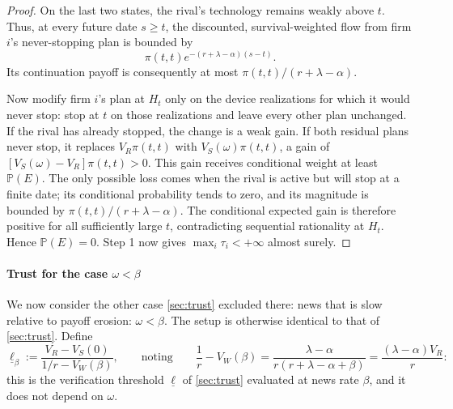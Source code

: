 \documentclass[12pt,reqno]{article}
\renewcommand{\Pr}{\mathbb{P}}
\theoremstyle{definition} \newtheorem{example}{Example}
\theoremstyle{definition} \newtheorem{condition}{Condition}
\theoremstyle{definition} \newtheorem{corollary}{Corollary}
\theoremstyle{definition} \newtheorem{claim}{Claim}
\theoremstyle{definition} \newtheorem{definition}{Definition}
\theoremstyle{definition} \newtheorem{conjecture}{Conjecture}
\theoremstyle{definition} \newtheorem{Lemma}{Lemma}
\theoremstyle{definition} \newtheorem{lemma}{Lemma}
\theoremstyle{plain} \newtheorem{theorem}{Theorem}
\theoremstyle{definition} \newtheorem{assumption}{Assumption}
\theoremstyle{definition} \newtheorem*{assumptionnonumber}{Assumption}
\theoremstyle{definition} \newtheorem*{theoremNoNumber}{Proposition}
\theoremstyle{definition}
\theoremstyle{definition}\newtheorem{proposition}{Proposition}
\theoremstyle{definition} \newtheorem{result}{Result}
\theoremstyle{definition} \newtheorem*{definitionNoNumber}{Definition}
\theoremstyle{definition} \newtheorem{Definition}{Definition}
\theoremstyle{definition} \newtheorem*{DefinitionNoNumber}{Definition}
\theoremstyle{definition} \newtheorem*{fact}{Fact}
\theoremstyle{definition} \newtheorem*{property}{Property}
\theoremstyle{definition} \newtheorem{remark}{Remark}
\begin{document}
\begin{proof}
On the last two states, the rival's technology remains weakly above $t$.
Thus, at every future date $s\ge t$, the discounted, survival-weighted flow
from firm $i$'s never-stopping plan is bounded by
\[
\pi(t,t)e^{-(r+\lambda-\alpha)(s-t)}.
\]
Its continuation payoff is consequently at most
$\pi(t,t)/(r+\lambda-\alpha)$.

Now modify firm $i$'s plan at $H_t$ only on the device realizations for which
it would never stop: stop at $t$ on those realizations and leave every other
plan unchanged. If the
rival has already stopped, the change is a weak gain. If both residual plans
never stop, it replaces $V_R\pi(t,t)$ with
$V_S(\omega)\pi(t,t)$, a gain of
$[V_S(\omega)-V_R]\pi(t,t)>0$. This gain receives conditional weight at least
$\Pr(E)$. The only possible loss comes when the rival is active but will stop
at a finite date; its conditional probability tends to zero, and its magnitude
is bounded by $\pi(t,t)/(r+\lambda-\alpha)$. The conditional expected gain is
therefore positive for all sufficiently large $t$, contradicting sequential
rationality at $H_t$. Hence $\Pr(E)=0$. Step 1 now gives
$\max_i\tau_i<+\infty$ almost surely.
\end{proof}

\paragraph{Trust for the case $\omega < \beta$} We now consider the other case \cref{sec:trust} excluded there: news that is slow relative to payoff erosion: $\omega<\beta$. The setup is otherwise identical to that of \cref{sec:trust}. Define
\[
\underline\ell_\beta:=\frac{V_R-V_S(0)}{1/r-V_W(\beta)},
\qquad\text{noting}\qquad
\frac1r-V_W(\beta)=\frac{\lambda-\alpha}{r(r+\lambda-\alpha+\beta)}=\frac{(\lambda-\alpha)V_R}{r}:
\]
this is the verification threshold $\underline\ell$ of \cref{sec:trust} evaluated at news rate $\beta$, and it does not depend on $\omega$.
\end{document}
